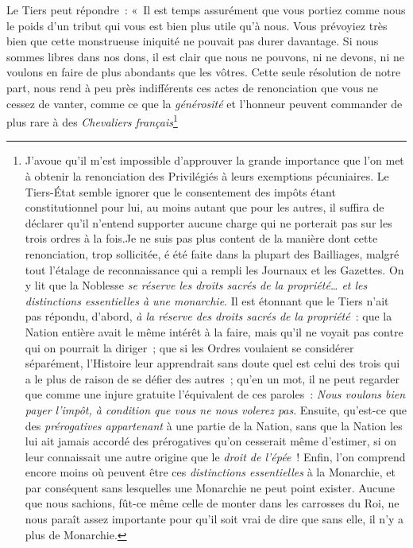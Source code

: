 \documentclass[french,twoside]{book} %
\begin{document}
Le Tiers peut répondre : « Il est temps assurément que vous portiez comme nous le poids d’un tribut qui vous est bien plus utile qu’à nous. Vous prévoyiez très bien que cette monstrueuse iniquité ne pouvait pas durer davantage. Si nous sommes libres dans nos dons, il est clair que nous ne pouvons, ni ne devons, ni ne voulons en faire de plus abondants que les vôtres. Cette seule résolution de notre part, nous rend à peu près indifférents ces actes de renonciation que vous ne cessez de vanter, comme ce que la {\itshape générosité} et l’honneur peuvent commander de plus rare à des {\itshape Chevaliers français}\footnote{\noindent J’avoue qu’il m’est impossible d’approuver la grande importance que l’on met à obtenir la renonciation des Privilégiés à leurs exemptions pécuniaires. Le Tiers-État semble ignorer que le consentement des impôts étant constitutionnel pour lui, au moins autant que pour les autres, il suffira de déclarer qu’il n’entend supporter aucune charge qui ne porterait pas sur les trois ordres à la fois.Je ne suis pas plus content de la manière dont cette renonciation, trop sollicitée, é été faite dans la plupart des Bailliages, malgré tout l’étalage de reconnaissance qui a rempli les Journaux et les Gazettes. On y lit que la Noblesse {\itshape se réserve les droits sacrés de la propriété… et les distinctions essentielles à une monarchie}. Il est étonnant que le Tiers n’ait pas répondu, d’abord, {\itshape à la réserve des droits sacrés de la propriété} : que la Nation entière avait le même intérêt à la faire, mais qu’il ne voyait pas contre qui on pourrait la diriger ; que si les Ordres voulaient se considérer séparément, l’Histoire leur apprendrait sans doute quel est celui des trois qui a le plus de raison de se défier des autres ; qu’en un mot, il ne peut regarder que comme une injure gratuite l’équivalent de ces paroles : {\itshape Nous voulons bien payer l’impôt, à condition que vous ne nous volerez pas}. Ensuite, qu’est-ce que des {\itshape prérogatives appartenant} à une partie de la Nation, sans que la Nation les lui ait jamais accordé des prérogatives qu’on cesserait même d’estimer, si on leur connaissait une autre origine que le {\itshape droit de l’épée} ! Enfin, l’on comprend encore moins où peuvent être ces {\itshape distinctions essentielles} à la Monarchie, et par conséquent sans lesquelles une Monarchie ne peut point exister. Aucune que nous sachions, fût-ce même celle de monter dans les carrosses du Roi, ne nous paraît assez importante pour qu’il soit vrai de dire que sans elle, il n’y a plus de Monarchie.\par

}
\end{document}
